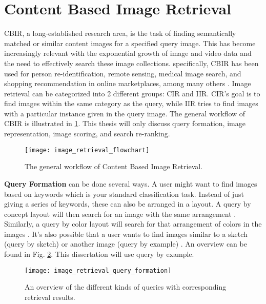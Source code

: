 \section{Content Based Image Retrieval}
\gls{CBIR}, a long-established research area, is the task of finding semantically matched or similar content images for a specified query image.
This has become increasingly relevant with the exponential growth of image and video data and the need to effectively search these image collections.
specifically, \gls{CBIR} has been used for person re-identification, remote sensing, medical image search, and shopping recommendation in online marketplaces, among many others \cite{Chen2021}.
Image retrieval can be categorized into 2 different groups: \gls{CIR} and \gls{IIR}.
\gls{CIR}'s goal is to find images within the same category as the query, while \gls{IIR} tries to find images with a particular instance given in the query image.
The general workflow of \gls{CBIR} is illustrated in \ref{fig:image_retrieval_flowchart}.
This thesis will only discuss query formation, image representation, image scoring, and search re-ranking.

\begin{figure}
	\centering
	\texttt{[image: image\_retrieval\_flowchart]}%
	\label{fig:image_retrieval_flowchart}
	\caption{
		The general workflow of Content Based Image Retrieval. \cite{Zhou2017}
	}
\end{figure}

\textbf{Query Formation} can be done several ways.
A user might want to find images based on keywords which is your standard classification task.
Instead of just giving a series of keywords, these can also be arranged in a layout.
A query by concept layout will then search for an image with the same arrangement \cite{Xu2010}.
Similarly, a query by color layout will search for that arrangement of colors in the images \cite{Wang2011}.
It's also possible that a user wants to find images similar to a sketch (query by sketch) \cite{Cao2010} or another image (query by example) \cite{Radenovic2017}.
An overview can be found in Fig. \ref{fig:image_retrieval_query_formation}.
This dissertation will use query by example.

\begin{figure}
	\centering
	\texttt{[image: image\_retrieval\_query\_formation]}%
	\caption{
		An overview of the different kinds of queries with corresponding retrieval results. \cite{Zhou2017}
	}
	\label{fig:image_retrieval_query_formation}
\end{figure}

